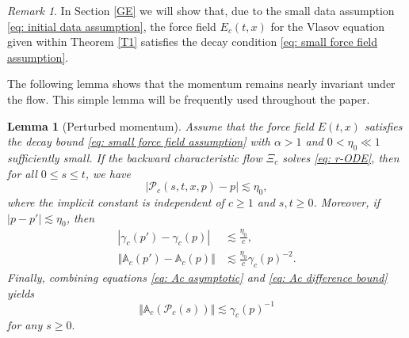 \documentclass[reqno, 11pt, letterpaper]{amsart}
\newtheorem{lemma}[theorem]{Lemma}
\theoremstyle{remark}
\newtheorem{remark}[theorem]{Remark}
\numberwithin{equation}{section}
\numberwithin{theorem}{section}
\numberwithin{table}{section}
\numberwithin{figure}{section}
\begin{document}
\begin{remark}
In Section \ref{GE} we will show that, due to the small data assumption \eqref{eq: initial data assumption}, the force field $E_c(t,x)$ for the Vlasov equation given within Theorem \ref{T1} satisfies the decay condition \eqref{eq: small force field assumption}.
\end{remark}



The following lemma shows that the momentum remains nearly invariant under the flow. This simple lemma will be frequently used throughout the paper.
\begin{lemma}[Perturbed momentum]
\label{lemma: perturbed momentum}
Assume that the force field $E(t,x)$ satisfies the decay bound \eqref{eq: small force field assumption} with $\alpha > 1$ and $0< \eta_0 \ll 1$ sufficiently small. If the backward characteristic flow $\Xi_c$ solves \eqref{eq: r-ODE}, then for all $0\leq s\leq t$,
we have
\begin{equation}\label{eq: bound for Pc}
\left | \mathcal{P}_c(s,t,x,p)- p \right | \lesssim \eta_0,
\end{equation}
where the implicit constant is independent of $c \geq 1$ and $s,t \geq 0$.
Moreover, if $|p-p'|\lesssim\eta_0$, then
\begin{align}
\left |\gamma_c(p') - \gamma_c(p) \right | & \lesssim \frac{\eta_0}{c},\label{eq: gamma c difference bound}\\
\left \Vert \mathbb{A}_c(p') - \mathbb{A}_c(p) \right \Vert & \lesssim \frac{\eta_0}{c}\gamma_c(p)^{-2}.\label{eq: Ac difference bound}
\end{align}
Finally, combining equations \eqref{eq: Ac asymptotic} and \eqref{eq: Ac difference bound} yields
\begin{equation}\label{A bound}
\Vert \mathbb{A}_c(\mathcal{P}_c(s)) \Vert \lesssim \gamma_c(p)^{-1}
\end{equation}
for any $ s \geq 0.$
\end{lemma}
\end{document}
